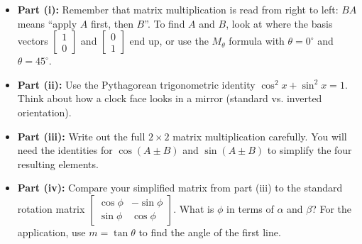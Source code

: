 \begin{hint}
\begin{itemize}
    \item \textbf{Part (i):} Remember that matrix multiplication is read from right to left: $BA$ means ``apply $A$ first, then $B$''. To find $A$ and $B$, look at where the basis vectors $\begin{bmatrix} 1 \\ 0 \end{bmatrix}$ and $\begin{bmatrix} 0 \\ 1 \end{bmatrix}$ end up, or use the $M_\theta$ formula with $\theta = 0^\circ$ and $\theta = 45^\circ$.
    \item \textbf{Part (ii):} Use the Pythagorean trigonometric identity $\cos^2 x + \sin^2 x = 1$. Think about how a clock face looks in a mirror (standard vs. inverted orientation).
    \item \textbf{Part (iii):} Write out the full $2 \times 2$ matrix multiplication carefully. You will need the identities for $\cos(A \pm B)$ and $\sin(A \pm B)$ to simplify the four resulting elements.
    \item \textbf{Part (iv):} Compare your simplified matrix from part (iii) to the standard rotation matrix $\begin{bmatrix} \cos \phi & -\sin \phi \\ \sin \phi & \cos \phi \end{bmatrix}$. What is $\phi$ in terms of $\alpha$ and $\beta$? For the application, use $m = \tan \theta$ to find the angle of the first line.
\end{itemize}
\end{hint}

